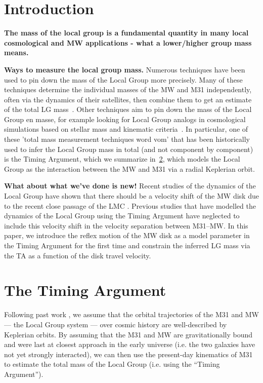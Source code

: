 \documentclass[twocolumn]{aastex631}
\begin{document}
\section{Introduction}
\label{sec:intro}
\textbf{The mass of the local group is a fundamental quantity in many local 
cosmological and MW applications - what a lower/higher group mass means.}

\textbf{Ways to measure the local group mass.}
Numerous techniques have been used to pin down the mass of the Local Group 
more precisely. 
Many of these techniques determine the individual masses of the MW and M31 
independently, often via the dynamics of their satellites, then combine them to 
get an estimate of the total LG mass~\citep{Patel??}. 
Other techniques aim to pin down the mass of the Local Group en masse, for 
example looking for Local Group analogs in cosmological simulations 
based on stellar mass and kinematic criteria~\citep{Zhai2020}.
In particular, one of these 'total mass measurement techniques word vom' 
that has been historically used to infer the 
Local Group mass in total (and not component by component) is the Timing 
Argument, which we summarize in~\ref{sec:timingarg}, which models the Local 
Group as the interaction between the MW and M31 via a radial Keplerian orbit.

\textbf{What about what we've done is new!}
Recent studies of the dynamics of the Local Group have shown that there should 
be a velocity shift of the MW disk due to the recent close passage of the LMC
\citep{Gomez2015,Garavito-Camargo2021b}. 
Previous studies that have modelled the dynamics of the Local Group using the 
Timing Argument have neglected to include this velocity shift in the velocity 
separation between M31--MW. 
In this paper, we introduce the reflex motion of the
MW disk as a model parameter in the Timing Argument for the first time and 
constrain the inferred LG mass via the TA as a function of the disk travel 
velocity. 
    


\section{The Timing Argument}
\label{sec:timingarg}

Following past work \citep[e.g.,][]{Lynden-Bell:1981, vdm2012, Penarrubia2016},
we assume that the orbital trajectories of the M31 and MW --- the Local Group
system --- over cosmic history are well-described by Keplerian orbits.
By assuming that the M31 and MW are gravitationally bound and were last at
closest approach in the early universe (i.e. the two galaxies have not yet
strongly interacted), we can then use the present-day kinematics of M31 to
estimate the total mass of the Local Group (i.e. using the ``Timing Argument'').
\end{document}
